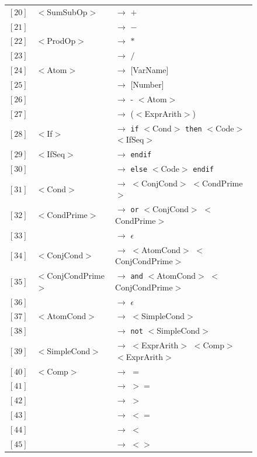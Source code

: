 \documentclass[letterpaper]{article}
\begin{document}
\begin{figure}[H]
\begin{tabular}{r l l}
        $[20]$ & $<$SumSubOp$>$ & $\rightarrow$ $+$ \\
        $[21]$ & & $\rightarrow$ $-$ \\
        $[22]$ & $<$ProdOp$>$ & $\rightarrow$ $*$ \\
        $[23]$ & & $\rightarrow$ $/$ \\
        $[24]$ & $<$Atom$>$ & $\rightarrow$ [VarName] \\
        $[25]$ & & $\rightarrow$ [Number] \\
        $[26]$ & & $\rightarrow$ - $<$Atom$>$ \\
        $[27]$ & & $\rightarrow$ ($<$ExprArith$>$) \\

        $[28]$ & $<$If$>$ & $\rightarrow$
        \texttt{if} $<$Cond$>$ \texttt{then} $<$Code$>$ $<$IfSeq$>$ \\
        $[29]$ & $<$IfSeq$>$ & $\rightarrow$
        \texttt{endif} \\
        $[30]$ & & $\rightarrow$
        \texttt{else} $<$Code$>$ \texttt{endif} \\

        $[31]$ & $<$Cond$>$ & $\rightarrow$
        $<$ConjCond$>$ $<$CondPrime$>$ \\
        $[32]$ & $<$CondPrime$>$ & $\rightarrow$
        \texttt{or} $<$ConjCond$>$ $<$CondPrime$>$ \\
        $[33]$ & & $\rightarrow$ $\epsilon$ \\
        $[34]$ & $<$ConjCond$>$ & $\rightarrow$
        $<$AtomCond$>$ $<$ConjCondPrime$>$ \\
        $[35]$ & $<$ConjCondPrime$>$ & $\rightarrow$
        \texttt{and} $<$AtomCond$>$ $<$ConjCondPrime$>$ \\
        $[36]$ & & $\rightarrow$ $\epsilon$ \\
        $[37]$ & $<$AtomCond$>$ & $\rightarrow$ $<$SimpleCond$>$ \\
        $[38]$ & & $\rightarrow$ \texttt{not} $<$SimpleCond$>$ \\

        $[39]$ & $<$SimpleCond$>$ & $\rightarrow$
        $<$ExprArith$>$ $<$Comp$>$ $<$ExprArith$>$ \\
        $[40]$ & $<$Comp$>$ & $\rightarrow$ $=$ \\
        $[41]$ & & $\rightarrow$ $>=$ \\
        $[42]$ & & $\rightarrow$ $>$ \\
        $[43]$ & & $\rightarrow$ $<=$ \\
        $[44]$ & & $\rightarrow$ $<$ \\
        $[45]$ & & $\rightarrow$ $<>$ \\


\end{tabular}
\end{figure}
\end{document}
